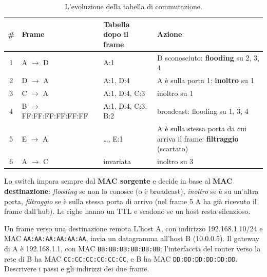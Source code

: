\svolgimento
\begin{table}[H]
\centering
\small
\begin{tabular}{clll}
\toprule
\textbf{\#} & \textbf{Frame} & \textbf{Tabella dopo il frame} & \textbf{Azione} \\
\midrule
1 & A $\rightarrow$ D & A:1 & D sconosciuto: \textbf{flooding} su 2, 3, 4 \\
2 & D $\rightarrow$ A & A:1, D:4 & A è sulla porta 1: \textbf{inoltro} su 1 \\
3 & C $\rightarrow$ A & A:1, D:4, C:3 & inoltro su 1 \\
4 & B $\rightarrow$ FF:FF:FF:FF:FF:FF & A:1, D:4, C:3, B:2 & broadcast: flooding su 1, 3, 4 \\
5 & E $\rightarrow$ A & \dots, E:1 & A è sulla stessa porta da cui arriva il frame: \textbf{filtraggio} (scartato) \\
6 & A $\rightarrow$ C & invariata & inoltro su 3 \\
\bottomrule
\end{tabular}
\caption{L'evoluzione della tabella di commutazione.}
\end{table}
Lo switch impara sempre dal \textbf{MAC sorgente} e decide in base al \textbf{MAC destinazione}: \emph{flooding} se non lo conosce (o è
broadcast), \emph{inoltro} se è su un'altra porta, \emph{filtraggio} se è sulla stessa porta di arrivo (nel frame 5 A ha già ricevuto il
frame dall'hub). Le righe hanno un TTL e scadono se un host resta silenzioso.

\begin{esercizio}{Un frame verso una destinazione remota}
L'host A, con indirizzo 192.168.1.10/24 e MAC \texttt{AA:AA:AA:AA:AA:AA}, invia un datagramma all'host B (10.0.0.5). Il gateway
di A è 192.168.1.1, con MAC \texttt{BB:BB:BB:BB:BB:BB}; l'interfaccia del router verso la rete di B ha MAC
\texttt{CC:CC:CC:CC:CC:CC}, e B ha MAC \texttt{DD:DD:DD:DD:DD:DD}. Descrivere i passi e gli indirizzi dei due frame.
\end{esercizio}

